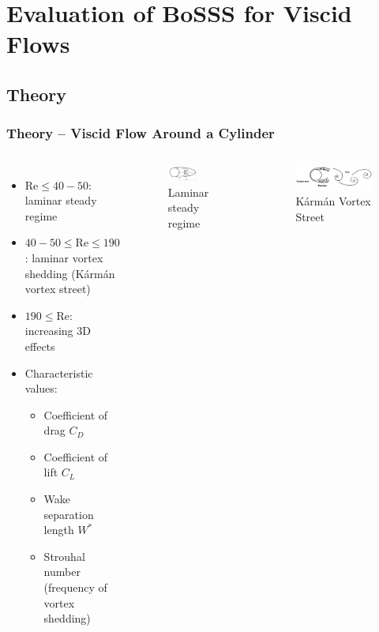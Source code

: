 \section{Evaluation of BoSSS for Viscid Flows}
\frame{\tableofcontents[currentsection]}
	\subsection{Theory}
	\begin{frame}
		\frametitle{Theory -- Viscid Flow Around a Cylinder}
		\begin{columns}[t]
			\column[]{6cm}
			\vspace{-0.5cm}
			\begin{itemize}
				\item $\text{Re} \leq 40-50$: laminar steady regime
				\item $40-50 \leq \text{Re} \leq 190$: laminar vortex shedding (Kármán vortex street)
				\item $190 \leq \text{Re}$: increasing 3D effects
				\item Characteristic values:
				\begin{itemize}
					\item Coefficient of drag $C_D$
					\item Coefficient of lift $C_L$
					\item Wake separation length $W^*$
					\item Strouhal number (frequency of vortex shedding)
				\end{itemize}
			\end{itemize}
			\column[]{6cm}
			\begin{figure}[ht]
				 \vspace{-1cm}
				\includegraphics[width=0.6\textwidth]{img/steadyFlow_modifiedWilliamson.PNG}
				\caption{Laminar steady regime \cite{williamson} }
			\end{figure}
			\begin{figure}[htbp]
				\includegraphics[width=\textwidth]{img/unsteady_Williamson.PNG}
				\caption{Kármán Vortex Street \cite{williamson} }
			\end{figure} 
		\end{columns}
	\end{frame}
